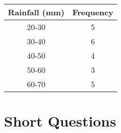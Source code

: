 \documentclass[a4paper,oneside]{book}
\begin{document}
\begin{enumerate}
    \begin{table}[h]
    \centering
\begin{tabular}{c|c}
\textbf{Rainfall (mm)} & \textbf{Frequency} \\ \hline
20-30                  & 5                  \\ \hline
30-40                  & 6                  \\ \hline
40-50                  & 4                  \\ \hline
50-60                  & 3                  \\
60-70                  & 5                 
\end{tabular}
\end{table}
\end{enumerate}

\section{Short Questions}
\end{document}
